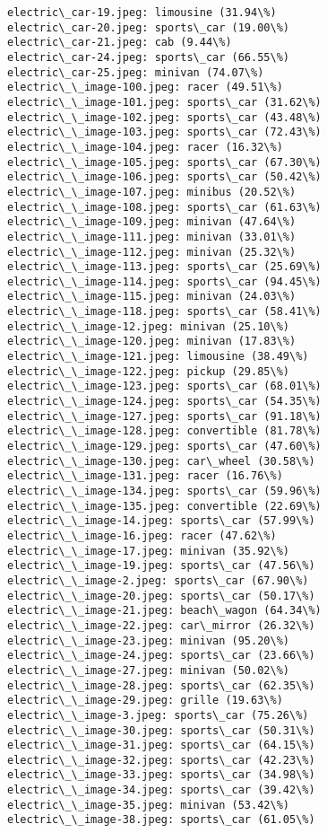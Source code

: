 \documentclass[11pt]{article}
\begin{document}
\begin{Verbatim}[commandchars=\\\{\}]
electric\_car-19.jpeg: limousine (31.94\%)
electric\_car-20.jpeg: sports\_car (19.00\%)
electric\_car-21.jpeg: cab (9.44\%)
electric\_car-24.jpeg: sports\_car (66.55\%)
electric\_car-25.jpeg: minivan (74.07\%)
electric\_\_image-100.jpeg: racer (49.51\%)
electric\_\_image-101.jpeg: sports\_car (31.62\%)
electric\_\_image-102.jpeg: sports\_car (43.48\%)
electric\_\_image-103.jpeg: sports\_car (72.43\%)
electric\_\_image-104.jpeg: racer (16.32\%)
electric\_\_image-105.jpeg: sports\_car (67.30\%)
electric\_\_image-106.jpeg: sports\_car (50.42\%)
electric\_\_image-107.jpeg: minibus (20.52\%)
electric\_\_image-108.jpeg: sports\_car (61.63\%)
electric\_\_image-109.jpeg: minivan (47.64\%)
electric\_\_image-111.jpeg: minivan (33.01\%)
electric\_\_image-112.jpeg: minivan (25.32\%)
electric\_\_image-113.jpeg: sports\_car (25.69\%)
electric\_\_image-114.jpeg: sports\_car (94.45\%)
electric\_\_image-115.jpeg: minivan (24.03\%)
electric\_\_image-118.jpeg: sports\_car (58.41\%)
electric\_\_image-12.jpeg: minivan (25.10\%)
electric\_\_image-120.jpeg: minivan (17.83\%)
electric\_\_image-121.jpeg: limousine (38.49\%)
electric\_\_image-122.jpeg: pickup (29.85\%)
electric\_\_image-123.jpeg: sports\_car (68.01\%)
electric\_\_image-124.jpeg: sports\_car (54.35\%)
electric\_\_image-127.jpeg: sports\_car (91.18\%)
electric\_\_image-128.jpeg: convertible (81.78\%)
electric\_\_image-129.jpeg: sports\_car (47.60\%)
electric\_\_image-130.jpeg: car\_wheel (30.58\%)
electric\_\_image-131.jpeg: racer (16.76\%)
electric\_\_image-134.jpeg: sports\_car (59.96\%)
electric\_\_image-135.jpeg: convertible (22.69\%)
electric\_\_image-14.jpeg: sports\_car (57.99\%)
electric\_\_image-16.jpeg: racer (47.62\%)
electric\_\_image-17.jpeg: minivan (35.92\%)
electric\_\_image-19.jpeg: sports\_car (47.56\%)
electric\_\_image-2.jpeg: sports\_car (67.90\%)
electric\_\_image-20.jpeg: sports\_car (50.17\%)
electric\_\_image-21.jpeg: beach\_wagon (64.34\%)
electric\_\_image-22.jpeg: car\_mirror (26.32\%)
electric\_\_image-23.jpeg: minivan (95.20\%)
electric\_\_image-24.jpeg: sports\_car (23.66\%)
electric\_\_image-27.jpeg: minivan (50.02\%)
electric\_\_image-28.jpeg: sports\_car (62.35\%)
electric\_\_image-29.jpeg: grille (19.63\%)
electric\_\_image-3.jpeg: sports\_car (75.26\%)
electric\_\_image-30.jpeg: sports\_car (50.31\%)
electric\_\_image-31.jpeg: sports\_car (64.15\%)
electric\_\_image-32.jpeg: sports\_car (42.23\%)
electric\_\_image-33.jpeg: sports\_car (34.98\%)
electric\_\_image-34.jpeg: sports\_car (39.42\%)
electric\_\_image-35.jpeg: minivan (53.42\%)
electric\_\_image-38.jpeg: sports\_car (61.05\%)

\end{Verbatim}
\end{document}
